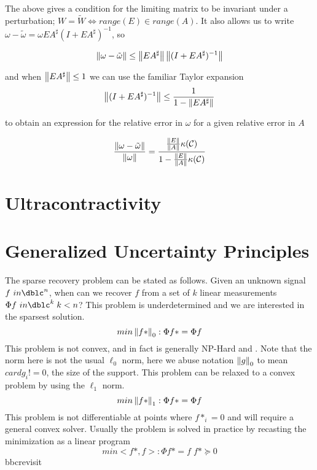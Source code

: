 The above gives a condition for the limiting matrix to be invariant under a perturbation;  $W=\tilde{W} \iff range(E) \in range(A)$.  It also allows us to write $\omega - \tilde{\omega} = \omega E A^\sharp (I+ E A^\sharp)^{-1}$, so

\begin{equation}
\left\Vert\omega - \tilde{\omega}\right\Vert \leq \left\Vert E A^\sharp\right\Vert \left\Vert (I+E A^\sharp)^{-1}\right\Vert
\end{equation}

and when $\left\Vert E A^\sharp\right\Vert \leq 1$ we can use the familiar Taylor expansion
\begin{equation}
\left\Vert(I+E A^\sharp)^{-1}\right\Vert \leq \frac{1}{ 1 - \left\Vert E A^\sharp \right\Vert }
\end{equation}

to obtain an expression for the relative error in $\omega$ for a given relative error in $A$

\begin{equation}
\frac{\left\Vert\omega - \tilde{\omega}\right\Vert}{\left\Vert\omega\right\Vert} = \frac{ \frac{\left\Vert E\right\Vert}{\left\Vert A\right\Vert} \kappa(\mathcal{C}) } {1 - \frac{\left\Vert E\right\Vert}{\left\Vert A\right\Vert} \kappa(\mathcal{C}) }
\end{equation}



\section{Ultracontractivity}


\section{Generalized Uncertainty Principles}
The sparse recovery problem can be stated as follows.  Given an unknown signal $f \ in \dblc^n$, when can we recover $f$ from a set of $k$ linear measurements $\Phi f \ in \dblc^k \; k<n$? This problem is underdetermined and we are interested in the sparsest solution.
\begin{equation*}
min \left\Vert f*\right\Vert_0 : \Phi f* = \Phi f
\end{equation*}
This problem is not convex, and in fact is generally NP-Hard \cite{Donoho04formost} and \cite{natarajan1995sparse}.  Note that the norm here is not the usual $\ell_0$ norm, here we abuse notation $\left\Vert g\right\Vert_0$ to mean $card{g_i ! = 0}$, the size of the support. This problem can be relaxed to a convex problem by using the $\ell_1$ norm.
\begin{equation*}
min \left\Vert f*\right\Vert_1 : \Phi f* = \Phi f
\end{equation*}
This problem is not differentiable at points where $f*_i=0$ and will require a general convex solver.  Usually the problem is solved in practice by recasting the minimization as a linear program
\begin{equation*}
min <f*,f> : \Phi f* = f \;  f* \succeq 0
\end{equation*}
bbcrevisit

